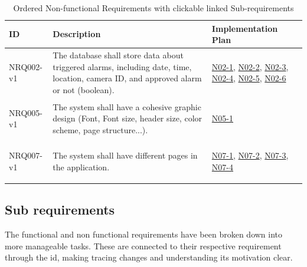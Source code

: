 \documentclass{article}
\begin{document}
\begin{table}[h!]
\centering
\begin{tabular}{|l|p{8cm}|p{5cm}|}
\hline
\textbf{ID} & \textbf{Description} & \textbf{Implementation Plan} \\
\hline
\hypertarget{NRQ002}{NRQ002-v1} & The database shall store data about triggered alarms, including date, time, location, camera ID, and approved alarm or not (boolean). & 
\hyperlink{N02-1}{N02-1}, \hyperlink{N02-2}{N02-2}, \hyperlink{N02-3}{N02-3}, \hyperlink{N02-4}{N02-4}, \hyperlink{N02-5}{N02-5}, \hyperlink{N02-6}{N02-6} \\
\hline
\hypertarget{NRQ005}{NRQ005-v1} & The system shall have a cohesive graphic design (Font, Font size, header size, color scheme, page structure...). & 
\hyperlink{N05-1}{N05-1} \\
\hline
\hypertarget{NRQ007}{NRQ007-v1} & The system shall have different pages in the application. & 
\hyperlink{N07-1}{N07-1}, \hyperlink{N07-2}{N07-2}, \hyperlink{N07-3}{N07-3}, \hyperlink{N07-4}{N07-4} \\
\hline
\end{tabular}
\captionsetup{justification=centering}
\caption{Ordered Non-functional Requirements with clickable linked Sub-requirements}
\label{table:nonfunctional_requirements}
\end{table}

\clearpage

\subsection{Sub requirements}

The functional and non functional requirements have been broken down into more manageable tasks. These are connected to their respective requirement through the id, making tracing changes and understanding its motivation clear.
\end{document}
